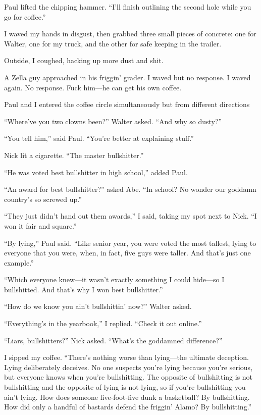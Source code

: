Paul lifted the chipping hammer. ``I'll finish outlining the second hole
while you go for coffee.''

I waved my hands in disgust, then grabbed three small pieces of
concrete: one for Walter, one for my truck, and the other for safe
keeping in the trailer.

Outside, I coughed, hacking up more dust and shit.

A Zella guy approached in his friggin' grader. I waved but no response.
I waved again. No response. Fuck him---he can get his own coffee.

Paul and I entered the coffee circle simultaneously but from different
directions

``Where've you two clowns been?'' Walter asked. ``And why so dusty?''

``You tell him,'' said Paul. ``You're better at explaining stuff.''

Nick lit a cigarette. ``The master bullshitter.''

``He was voted best bullshitter in high school,'' added Paul.

``An award for best bullshitter?'' asked Abe. ``In school? No wonder our
goddamn country's so screwed up.''

``They just didn't hand out them awards,'' I said, taking my spot next
to Nick. ``I won it fair and square.''

``By lying,'' Paul said. ``Like senior year, you were voted the most
tallest, lying to everyone that you were, when, in fact, five guys were
taller. And that's just one example.''

``Which everyone knew---it wasn't exactly something I could hide---so I
bullshitted. And that's why I won best bullshitter.''

``How do we know you ain't bullshittin' now?'' Walter asked.

``Everything's in the yearbook,'' I replied. ``Check it out online.''

``Liars, bullshitters?'' Nick asked. ``What's the goddamned
difference?''

I sipped my coffee. ``There's nothing worse than lying---the ultimate
deception. Lying deliberately deceives. No one suspects you're lying
because you're serious, but everyone knows when you're bullshitting. The
opposite of bullshitting is not bullshitting and the opposite of lying
is not lying, so if you're bullshitting you ain't lying. How does
someone five-foot-five dunk a basketball? By bullshitting. How did only
a handful of bastards defend the friggin' Alamo? By bullshitting.''


